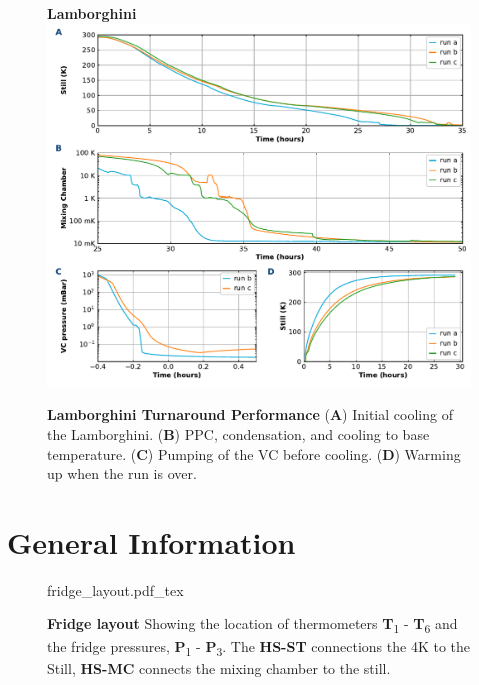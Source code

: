 \documentclass{article}[18pt,A4]
\newcommand{\thing}[1]{{\color{gray}\textsc{ \textbf{#1}}}}
\newcommand{\pressure}[1]{{\color{pressurecolor}\textbf{P}\textsubscript{#1}}}
\newcommand{\temperature}[1]{{\color{temperaturecolor}\textbf{T}\textsubscript{#1}}}
\begin{document}
\begin{figure}[h]
\centering
\textbf{\color{sectioncolor}Lamborghini}
\includegraphics{fig/lamb_performance.pdf}
\caption{\textbf{Lamborghini Turnaround Performance}
(\textbf{\color{sectioncolor}A}) Initial cooling of the Lamborghini.
(\textbf{\color{sectioncolor}B}) PPC, condensation, and cooling to base temperature.
(\textbf{\color{sectioncolor}C}) Pumping of the VC before cooling.
(\textbf{\color{sectioncolor}D}) Warming up when the run is over.
}
\end{figure}

\clearpage
\section{General Information}




\begin{figure}[h]
\centering
{fridge_layout.pdf_tex}
\caption{\textbf{Fridge layout} Showing the location of thermometers \temperature{1} - \temperature{6} and the fridge pressures, \pressure{1} - \pressure{3}. The \thing{HS-ST} connections the 4K to the Still, \thing{HS-MC} connects the mixing chamber to the still. 
\label{fig:fridge_layout}
}
\end{figure}
\end{document}
